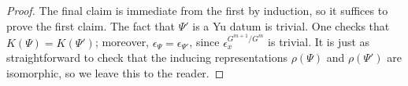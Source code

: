 \documentclass[reqno]{amsart}
\numberwithin{equation}{subsection}
\theoremstyle{remark}
\numberwithin{equation}{subsection}
\numberwithin{figure}{subsection}
\begin{document}
\begin{proof}
The final claim is immediate from the first by induction, so it suffices to prove the first claim. The fact that $\Psi'$ is a Yu datum is trivial.
One checks that $K(\Psi) = K(\Psi')$; moreover, $\epsilon_\Psi = \epsilon_{\Psi'}$, since $\epsilon_x^{G^{m+1}/G^m}$ is trivial. It is just as straightforward to check that the inducing representations $\rho(\Psi)$ and $\rho(\Psi')$ are isomorphic, so we leave this to the reader.
\end{proof}
\end{document}
